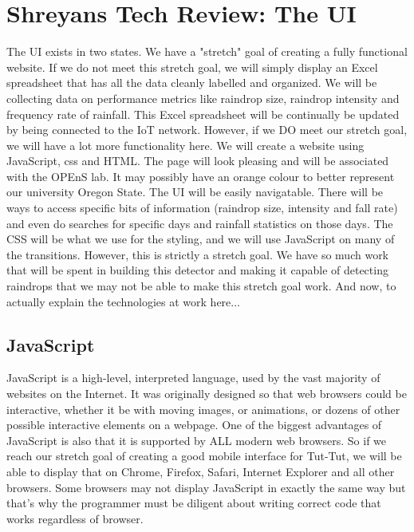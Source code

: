 \documentclass[letterpaper,10pt,draftclsnofoot,onecolumn]{article}
\begin{document}
\section{Shreyans Tech Review: The UI}
The UI exists in two states. We have a "stretch" goal of creating a fully functional website. If we do not meet this stretch goal, we will simply display an Excel spreadsheet that has all the data cleanly labelled and organized. We will be collecting data on performance metrics like raindrop size, raindrop intensity and frequency rate of rainfall. This Excel spreadsheet will be continually be updated by being connected to the IoT network.
\newline
However, if we DO meet our stretch goal, we will have a lot more functionality here. We will create a website using JavaScript, css and HTML. The page will look pleasing and will be associated with the OPEnS lab. It may possibly have an orange colour to better represent our university Oregon State. 
\newline
The UI will be easily navigatable. There will be ways to access specific bits of information (raindrop size, intensity and fall rate) and even do searches for specific days and rainfall statistics on those days. The CSS will be what we use for the styling, and we will use JavaScript on many of the transitions. However, this is strictly a stretch goal. We have so much work that will be spent in building this detector and making it capable of detecting raindrops that we may not be able to make this stretch goal work.
\newline
And now, to actually explain the technologies at work here...
\subsection{JavaScript}
JavaScript is a high-level, interpreted language, used by the vast majority of websites on the Internet. It was originally designed so that web browsers could be interactive, whether it be with moving images, or animations, or dozens of other possible interactive elements on a webpage. 
\cite{ChrisMinnick}
One of the biggest advantages of JavaScript is also that it is supported by ALL modern web browsers. So if we reach our stretch goal of creating a good mobile interface for Tut-Tut, we will be able to display that on Chrome, Firefox, Safari, Internet Explorer and all other browsers. Some browsers may not display JavaScript in exactly the same way but that's why the programmer must be diligent about writing correct code that works regardless of browser.
\cite{Wiki}
\end{document}
